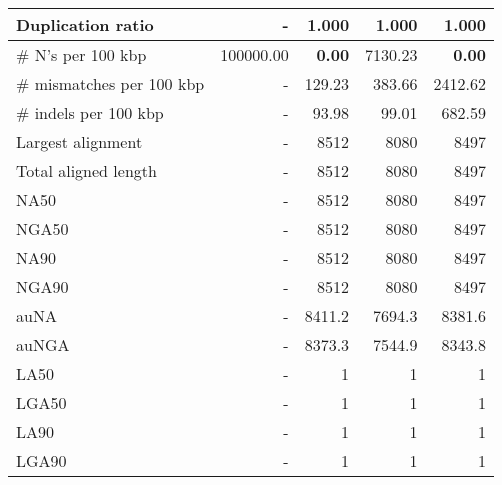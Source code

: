 \documentclass[12pt,a4paper]{article}
\begin{document}
\begin{table}[ht]
\begin{center}
\begin{tabular}{|l*{4}{|r}|}
Duplication ratio & - & 1.000 & 1.000 & 1.000 \\ \hline
\# N's per 100 kbp & 100000.00 & {\bf 0.00} & 7130.23 & {\bf 0.00} \\ \hline
\# mismatches per 100 kbp & - & 129.23 & 383.66 & 2412.62 \\ \hline
\# indels per 100 kbp & - & 93.98 & 99.01 & 682.59 \\ \hline
Largest alignment & - & 8512 & 8080 & 8497 \\ \hline
Total aligned length & - & 8512 & 8080 & 8497 \\ \hline
NA50 & - & 8512 & 8080 & 8497 \\ \hline
NGA50 & - & 8512 & 8080 & 8497 \\ \hline
NA90 & - & 8512 & 8080 & 8497 \\ \hline
NGA90 & - & 8512 & 8080 & 8497 \\ \hline
auNA & - & 8411.2 & 7694.3 & 8381.6 \\ \hline
auNGA & - & 8373.3 & 7544.9 & 8343.8 \\ \hline
LA50 & - & 1 & 1 & 1 \\ \hline
LGA50 & - & 1 & 1 & 1 \\ \hline
LA90 & - & 1 & 1 & 1 \\ \hline
LGA90 & - & 1 & 1 & 1 \\ \hline
\end{tabular}
\end{center}
\end{table}
\end{document}
